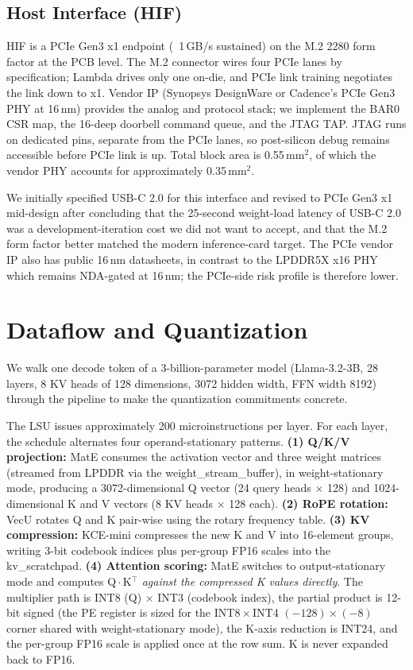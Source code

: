 \documentclass[conference]{IEEEtran}
\begin{document}
\subsection{Host Interface (HIF)}

HIF is a PCIe Gen3 x1 endpoint (~1\,GB/s sustained) on the M.2 2280 form factor at the PCB level. The M.2 connector wires four PCIe lanes by specification; Lambda drives only one on-die, and PCIe link training negotiates the link down to x1. Vendor IP (Synopsys DesignWare or Cadence's PCIe Gen3 PHY at 16\,nm) provides the analog and protocol stack; we implement the BAR0 CSR map, the 16-deep doorbell command queue, and the JTAG TAP. JTAG runs on dedicated pins, separate from the PCIe lanes, so post-silicon debug remains accessible before PCIe link is up. Total block area is 0.55\,mm$^2$, of which the vendor PHY accounts for approximately 0.35\,mm$^2$.

We initially specified USB-C 2.0 for this interface and revised to PCIe Gen3 x1 mid-design after concluding that the 25-second weight-load latency of USB-C 2.0 was a development-iteration cost we did not want to accept, and that the M.2 form factor better matched the modern inference-card target. The PCIe vendor IP also has public 16\,nm datasheets, in contrast to the LPDDR5X x16 PHY which remains NDA-gated at 16\,nm; the PCIe-side risk profile is therefore lower.

\section{Dataflow and Quantization}
\label{sec:dataflow}

We walk one decode token of a 3-billion-parameter model (Llama-3.2-3B, 28 layers, 8 KV heads of 128 dimensions, 3072 hidden width, FFN width 8192) through the pipeline to make the quantization commitments concrete.

The LSU issues approximately 200 microinstructions per layer. For each layer, the schedule alternates four operand-stationary patterns. \textbf{(1) Q/K/V projection:} MatE consumes the activation vector and three weight matrices (streamed from LPDDR via the weight\_stream\_buffer), in weight-stationary mode, producing a 3072-dimensional Q vector (24 query heads $\times$ 128) and 1024-dimensional K and V vectors (8 KV heads $\times$ 128 each). \textbf{(2) RoPE rotation:} VecU rotates Q and K pair-wise using the rotary frequency table. \textbf{(3) KV compression:} KCE-mini compresses the new K and V into 16-element groups, writing 3-bit codebook indices plus per-group FP16 scales into the kv\_scratchpad. \textbf{(4) Attention scoring:} MatE switches to output-stationary mode and computes Q\,$\cdot$\,K$^\top$ \textit{against the compressed K values directly}. The multiplier path is INT8 (Q) $\times$ INT3 (codebook index), the partial product is 12-bit signed (the PE register is sized for the INT8\,$\times$\,INT4 $(-128)\times(-8)$ corner shared with weight-stationary mode), the K-axis reduction is INT24, and the per-group FP16 scale is applied once at the row sum. K is never expanded back to FP16.
\end{document}

